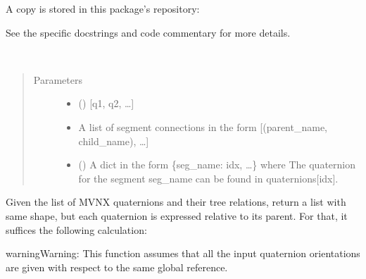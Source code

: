 \documentclass[letterpaper,10pt,english,openany,oneside]{sphinxmanual}
\begin{document}
A copy is stored in this package’s repository:
\begin{quote}

\end{quote}

See the specific docstrings and code commentary for more details.

\begin{fulllineitems}
\label{\detokenize{io_anim_mvnx:io_anim_mvnx.mvnx_import.global_to_inherited_quats}}~\begin{quote}\begin{description}
\item[{Parameters}] \leavevmode\begin{itemize}
\item {} 
 () \textendash{} {[}q1, q2, …{]}

\item {} 
 \textendash{} A list of segment connections in the form
{[}(parent\_name, child\_name), …{]}

\item {} 
 () \textendash{} A dict in the form \{seg\_name: idx, …\} where
The quaternion for the segment seg\_name can be found in quaternions{[}idx{]}.

\end{itemize}

\end{description}\end{quote}

Given the list of MVNX quaternions and their tree relations,
return a list with same shape, but each quaternion is expressed relative
to its parent. For that, it suffices the following calculation:

\begin{sphinxVerbatim}[commandchars=\\\{\}]
    
\end{sphinxVerbatim}

\begin{sphinxadmonition}{warning}{Warning:}
This function assumes that all the input quaternion orientations are
given with respect to the same global reference.
\end{sphinxadmonition}

\end{fulllineitems}
\end{document}
